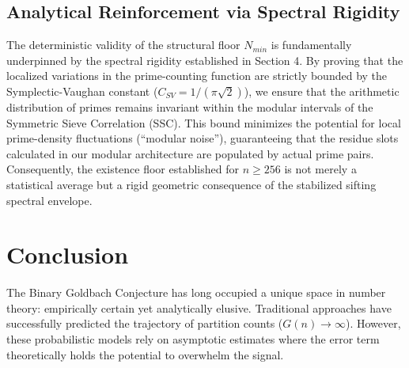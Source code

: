 \documentclass[twoside,9pt]{extarticle}
\begin{document}
\subsection{Analytical Reinforcement via Spectral Rigidity}
The deterministic validity of the structural floor $N_{min}$ is fundamentally underpinned by the spectral rigidity established in Section 4. By proving that the localized variations in the prime-counting function are strictly bounded by the Symplectic-Vaughan constant ($C_{SV} = 1/(\pi\sqrt{2})$), we ensure that the arithmetic distribution of primes remains invariant within the modular intervals of the Symmetric Sieve Correlation (SSC). This bound minimizes the potential for local prime-density fluctuations (``modular noise''), guaranteeing that the residue slots calculated in our modular architecture are populated by actual prime pairs. Consequently, the existence floor established for $n \ge 256$ is not merely a statistical average but a rigid geometric consequence of the stabilized sifting spectral envelope.

\section{Conclusion}

The Binary Goldbach Conjecture has long occupied a unique space in number theory: empirically certain yet analytically elusive. Traditional approaches have successfully predicted the trajectory of partition counts ($G(n) \to \infty$). However, these probabilistic models rely on asymptotic estimates where the error term theoretically holds the potential to overwhelm the signal.
\end{document}
